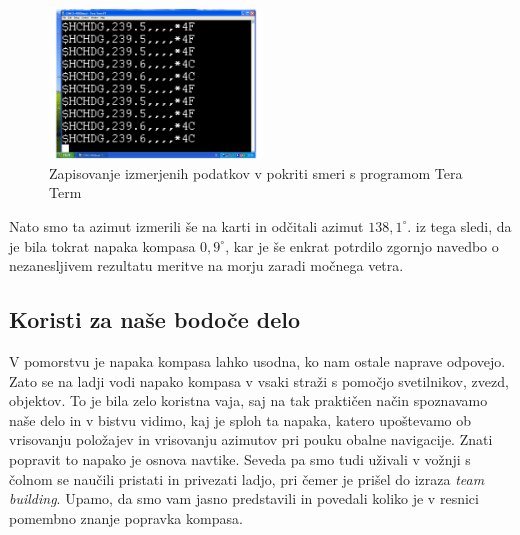 \begin{figure}
	\centering
	\includegraphics[height=4cm]{Vaje/VzorecPoroc/figs/TT_zapisovanje.pdf}
	\caption{Zapisovanje izmerjenih podatkov v pokriti smeri s programom Tera Term}
	\label{fig:TT_zapisovanjePokriteSmeri}       %
\end{figure}

Nato smo ta azimut izmerili še na karti in odčitali azimut $138,1^{\circ}$. iz tega sledi, da je bila tokrat napaka kompasa $0,9^{\circ}$, kar je še enkrat potrdilo zgornjo navedbo o nezanesljivem rezultatu meritve na morju zaradi močnega vetra. 




\subsection{Koristi za naše bodoče delo}
\label{sec:2}
V pomorstvu je napaka kompasa lahko usodna,  ko nam ostale naprave odpovejo. Zato se na ladji vodi napako kompasa v vsaki straži s pomočjo svetilnikov, zvezd, objektov. To je bila zelo koristna vaja, saj na tak praktičen način spoznavamo naše delo in v bistvu vidimo, kaj je sploh ta napaka, katero upoštevamo ob vrisovanju položajev in vrisovanju azimutov pri pouku obalne navigacije. Znati popravit to napako je osnova navtike. Seveda pa smo tudi uživali v vožnji s čolnom se naučili pristati in privezati ladjo, pri čemer je prišel do izraza \textit{team building}. Upamo, da smo vam jasno predstavili in povedali koliko je v resnici pomembno znanje popravka kompasa.




%
